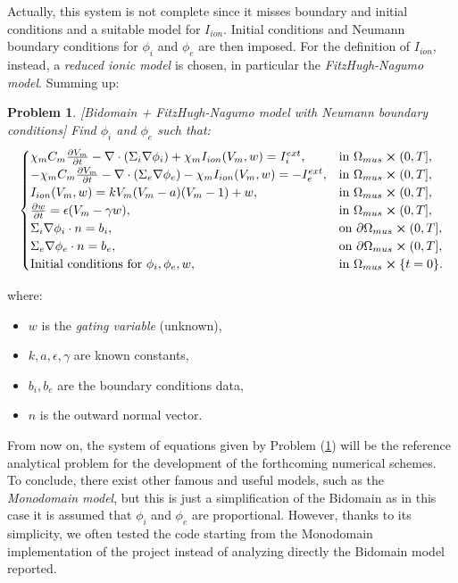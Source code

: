 \documentclass[a4paper,11pt]{article}
\newtheorem{problem}{Problem}
\begin{document}
    \vspace{4mm}
    \noindent Actually, this system is not complete since it misses boundary and initial conditions and a suitable model for $I_{ion}$. Initial conditions and Neumann boundary conditions for $\phi_i$ and $\phi_e$ are then imposed. For the definition of $I_{ion}$, instead, a \emph{reduced ionic model} is chosen, in particular the \emph{FitzHugh-Nagumo model}. Summing up:\newpage
        \begin{problem}\label{def1}[Bidomain + FitzHugh-Nagumo model with Neumann boundary conditions]
      	Find $\phi_i$ and $\phi_e$ such that:
    	\begin{equation*}
    	\begin{cases}
    	\chi_m C_m\pdv{V_m}{t} - \nabla \cdot (\Sigma_i \nabla \phi_i) + \chi_m I_{ion}(V_m,w) = I_i^{ext},    & \text{in } \Omega_{mus} \cross (0,T],
    	\\
    	-\chi_m C_m\pdv{V_m}{t} - \nabla \cdot (\Sigma_e \nabla \phi_e) - \chi_m I_{ion}(V_m,w) = -I_e^{ext},    & \text{in } \Omega_{mus} \cross (0,T],
    	\\
    	I_{ion}(V_m,w)=kV_m(V_m-a)(V_m-1)+w, & \text{in } \Omega_{mus} \cross (0,T],
    	\\
    	\pdv{w}{t} = \epsilon(V_m-\gamma w),  & \text{in } \Omega_{mus} \cross (0,T],
    	\\
    	\Sigma_i\nabla \phi_i \cdot n = b_i,   & \text{on } \partial \Omega_{mus} \cross (0,T],
    	\\
    	\Sigma_e\nabla \phi_e \cdot n = b_e,   & \text{on } \partial \Omega_{mus} \cross (0,T],
    	\\
    	\text{Initial conditions for } \phi_i,\phi_e, w, & \text{in } \Omega_{mus}\cross\{t=0\}.
    	\end{cases}
    	\end{equation*}
    	\end{problem}
    \vspace{3mm}
    where:
    \begin{itemize}[label=\textendash]
    	\item $w$ is the \emph{gating variable} (unknown),
    	\item $k,a,\epsilon,\gamma$ are known constants,
    	\item $b_i,b_e$ are the boundary conditions data,
    	\item $n$ is the outward normal vector.
    \end{itemize}

    \vspace{4mm}
    \noindent From now on, the system of equations given by Problem (\ref{def1}) will be the reference analytical problem for the development of the forthcoming numerical schemes.\\
    To conclude, there exist other famous and useful models, such as the \emph{Monodomain model}, but this is just a simplification of the Bidomain as in this case it is assumed that $\phi_i$ and $\phi_e$ are proportional. However, thanks to its simplicity, we often tested the code starting from the Monodomain implementation of the project \cite{andreotti} instead of analyzing directly the Bidomain model reported.
\end{document}
